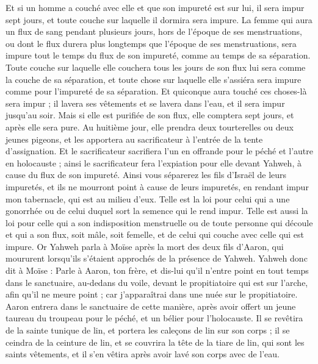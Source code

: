 \begin{multicols}{2}
Et si un homme a couché avec elle et que son impureté est sur lui, il sera impur sept jours, et toute couche sur laquelle il dormira sera impure.
La femme qui aura un flux de sang pendant plusieurs jours, hors de l’époque de ses menstruations, ou dont le flux durera plus longtemps que l’époque de ses menstruations, sera impure tout le temps du flux de son impureté, comme au temps de sa séparation.
Toute couche sur laquelle elle couchera tous les jours de son flux lui sera comme la couche de sa séparation, et toute chose sur laquelle elle s'assiéra sera impure comme pour l’impureté de sa séparation.
Et quiconque aura touché ces choses-là sera impur ; il lavera ses vêtements et se lavera dans l'eau, et il sera impur jusqu'au soir.
Mais si elle est purifiée de son flux, elle comptera sept jours, et après elle sera pure.
Au huitième jour, elle prendra deux tourterelles ou deux jeunes pigeons, et les apportera au sacrificateur à l'entrée de la tente d'assignation.
Et le sacrificateur sacrifiera l'un en offrande pour le péché et l'autre en holocauste ; ainsi le sacrificateur fera l’expiation  pour elle devant Yahweh, à cause du flux de son impureté.
Ainsi vous séparerez les fils d'Israël de leurs impuretés, et ils ne mourront point à cause de leurs impuretés, en rendant impur mon tabernacle, qui est au milieu d'eux.
Telle est la loi pour celui qui a une gonorrhée ou de celui duquel sort la semence qui le rend impur.
Telle est aussi la loi pour celle qui a son indisposition menstruelle ou de toute personne qui découle et qui a son flux, soit mâle, soit femelle, et de celui qui couche avec celle qui est impure.
\VerseOne{}Or Yahweh parla à Moïse après la mort des deux fils d'Aaron, qui moururent lorsqu’ils s’étaient approchés de la présence de Yahweh.
Yahweh donc dit à Moïse : Parle à Aaron, ton frère, et dis-lui qu'il n'entre point en tout temps dans le sanctuaire, au-dedans du voile, devant le propitiatoire qui est sur l'arche, afin qu'il ne meure point ; car j’apparaîtrai dans une nuée sur le propitiatoire.
Aaron entrera dans le sanctuaire de cette manière, après avoir offert un jeune taureau du troupeau pour le péché, et un bélier pour l'holocauste.
Il se revêtira de la sainte tunique de lin, et portera les caleçons de lin sur son corps ; il se ceindra de la ceinture de lin, et se couvrira la tête de la tiare de lin, qui sont les saints vêtements, et il s'en vêtira après avoir lavé son corps avec de l'eau.

\end{multicols}
